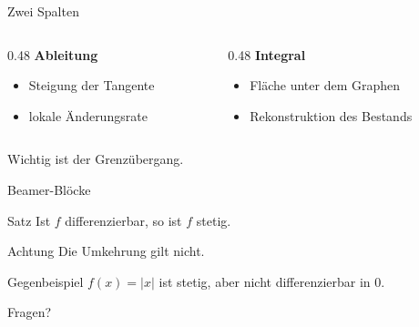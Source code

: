 \documentclass{mtalk}
\begin{document}
\begin{frame}{Zwei Spalten}
	\begin{columns}[T]
		\begin{column}{0.48\linewidth}
			\textbf{Ableitung}
			\begin{itemize}
				\item Steigung der Tangente
				\item lokale Änderungsrate
			\end{itemize}
		\end{column}
		\begin{column}{0.48\linewidth}
			\textbf{Integral}
			\begin{itemize}
				\item Fläche unter dem Graphen
				\item Rekonstruktion des Bestands
			\end{itemize}
		\end{column}
	\end{columns}

	\bigskip
	Wichtig ist der \alert{Grenzübergang}.
\end{frame}

\begin{frame}{Beamer-Blöcke}
	\begin{block}{Satz}
		Ist $f$ differenzierbar, so ist $f$ stetig.
	\end{block}
	\begin{alertblock}{Achtung}
		Die Umkehrung gilt nicht.
	\end{alertblock}
	\begin{exampleblock}{Gegenbeispiel}
		$f(x) = |x|$ ist stetig, aber nicht differenzierbar in $0$.
	\end{exampleblock}
\end{frame}

\begin{frame}[standout]
	Fragen?
\end{frame}
\end{document}
